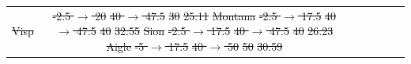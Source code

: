\documentclass[hess, manuscript]{copernicus}
\providecommand{\DIFadd}[1]{{\protect\color{blue}\uwave{#1}}} %
\providecommand{\DIFdel}[1]{{\protect\color{red}\sout{#1}}}                      %
\providecommand{\DIFaddFL}[1]{\DIFadd{#1}} %
\providecommand{\DIFdelFL}[1]{\DIFdel{#1}} %
\providecommand{\DIFaddbeginFL}{} %
\providecommand{\DIFaddendFL}{} %
\providecommand{\DIFdelbeginFL}{} %
\providecommand{\DIFdelendFL}{} %
\begin{document}
\begin{table}[htb]
\begin{center}
\begin{tabular}{l c c c c c c }
\DIFdelFL{Visp }\DIFdelendFL \DIFaddbeginFL \DIFaddFL{$N_{1}$ }\DIFaddendFL & \DIFdelbeginFL \DIFdelFL{-2.5 $\rightarrow$ 20 }%
\DIFdelFL{40 $\rightarrow$ 47.5 }%
\DIFdelFL{30 }%
\DIFdelFL{25.11 }%
\DIFdelFL{Montana }%
\DIFdelFL{-2.5 $\rightarrow$ 17.5 }%
\DIFdelFL{40 $\rightarrow$ 47.5 }%
\DIFdelFL{40 }%
\DIFdelFL{32.55 }%
\DIFdelFL{Sion }%
\DIFdelFL{-2.5 $\rightarrow$ 17.5 }%
\DIFdelFL{40 $\rightarrow$ 47.5 }%
\DIFdelFL{40 }%
\DIFdelFL{26.23 }%
\DIFdelFL{Aigle }%
\DIFdelFL{-5 $\rightarrow$ 17.5 }%
\DIFdelFL{40 $\rightarrow$ 50 }%
\DIFdelFL{50 }%
\DIFdelFL{30.59 }%


\end{tabular}
\end{center}
\end{table}
\end{document}
